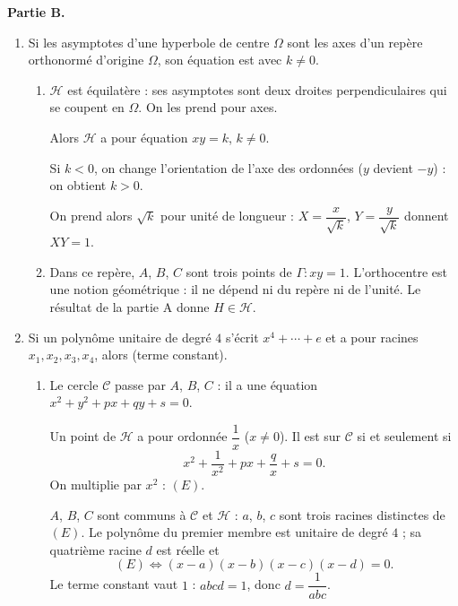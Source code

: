 \textbf{Partie B.}
\begin{enumerate}[itemsep=14pt]
  \item\leavevmode
  \begin{prop}
  Si les asymptotes d'une hyperbole de centre $\Omega$ sont les axes d'un repère orthonormé d'origine $\Omega$, son équation est  avec $k\neq0$.
  \end{prop}
  \begin{enumerate}[itemsep=8pt]
    \item $\mathcal H$ est équilatère : ses asymptotes sont deux droites perpendiculaires qui se coupent en $\Omega$. On les prend pour axes.

    Alors $\mathcal H$ a pour équation $xy=k$, $k\neq0$.

    Si $k<0$, on change l'orientation de l'axe des ordonnées ($y$ devient $-y$) : on obtient $k>0$.

    On prend alors $\sqrt k$ pour unité de longueur : $X=\dfrac{x}{\sqrt k}$, $Y=\dfrac{y}{\sqrt k}$ donnent $XY=1$.
    \item Dans ce repère, $A$, $B$, $C$ sont trois points de $\Gamma:xy=1$. L'orthocentre est une notion géométrique : il ne dépend ni du repère ni de l'unité. Le résultat de la partie A donne $H\in\mathcal H$.
  \end{enumerate}

  \item\leavevmode
  \begin{prop}
  Si un polynôme unitaire de degré $4$ s'écrit $x^4+\cdots+e$ et a pour racines $x_1,x_2,x_3,x_4$, alors  (terme constant).
  \end{prop}
  \begin{enumerate}[itemsep=8pt]
    \item Le cercle $\mathcal C$ passe par $A$, $B$, $C$ : il a une équation $x^2+y^2+px+qy+s=0$.

    Un point de $\mathcal H$ a pour ordonnée $\dfrac1x$ ($x\neq0$). Il est sur $\mathcal C$ si et seulement si
    \[x^2+\dfrac1{x^2}+px+\dfrac qx+s=0.\]
    On multiplie par $x^2$ : \quad $(E)$.

    $A$, $B$, $C$ sont communs à $\mathcal C$ et $\mathcal H$ : $a$, $b$, $c$ sont trois racines distinctes de $(E)$. Le polynôme du premier membre est unitaire de degré $4$ ; sa quatrième racine $d$ est réelle et
    \[(E)\iff (x-a)(x-b)(x-c)(x-d)=0.\]
    Le terme constant vaut $1$ : $abcd=1$, donc $d=\dfrac1{abc}$.


\end{enumerate}
\end{enumerate}
